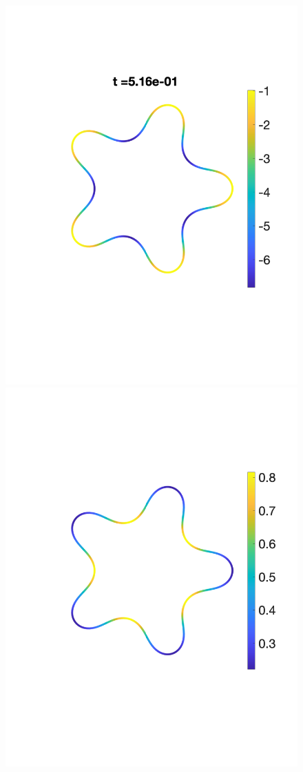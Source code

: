 \documentclass[9pt,twocolumn,twoside,lineno]{pnas-new}
\begin{document}
\begin{figure}[htp]
  \includegraphics[width=0.48\linewidth,trim =2cm 5cm 0cm 5cm, clip=true]{figures/StarTensionTime3.pdf}
  \includegraphics[width=0.48\linewidth,trim =2cm 5cm 0cm 5cm, clip=true]{figures/StarFluxTime3.pdf}


\end{figure}
\end{document}
